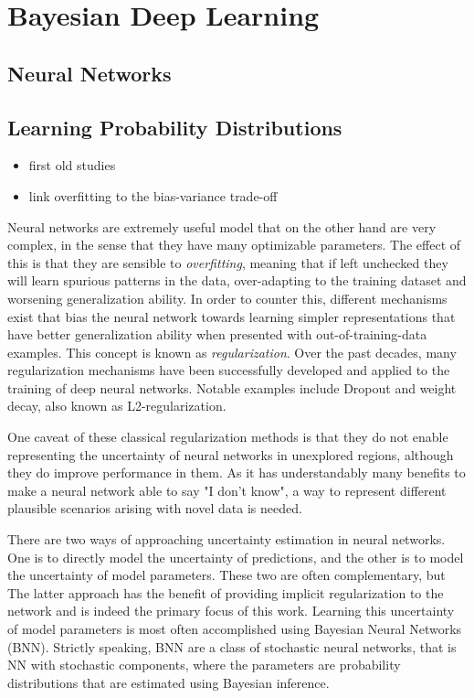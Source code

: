 \section{Bayesian Deep Learning}

\subsection{Neural Networks}

\subsection{Learning Probability Distributions}
\begin{itemize}
	\item first old studies
	\item link overfitting to the bias-variance trade-off
\end{itemize}

	Neural networks are extremely useful model that on the other hand are very complex, in the sense that they have many optimizable parameters. The effect of this is that they are sensible to \textit{overfitting}, meaning that if left unchecked they will learn spurious patterns in the data, over-adapting to the training dataset and worsening generalization ability. In order to counter this, different mechanisms exist that bias the neural network towards learning simpler representations that have better generalization ability when presented with out-of-training-data examples. This concept is known as \textit{regularization}. Over the past decades, many regularization mechanisms have been successfully developed and applied to the training of deep neural networks. Notable examples include Dropout and weight decay, also known as L2-regularization.  
	
	One caveat of these classical regularization methods is that they do not enable representing the uncertainty of neural networks in unexplored regions, although they do improve performance in them. As it has understandably many benefits to make a neural network able to say "I don't know", a way to represent different plausible scenarios arising with novel data is needed. 
	
	There are two ways of approaching uncertainty estimation in neural networks. One is to directly model the uncertainty of predictions, and the other is to model the uncertainty of model parameters. These two are often complementary, but The latter approach has the benefit of providing implicit regularization to the network and is indeed the primary focus of this work. Learning this uncertainty of model parameters is most often accomplished using Bayesian Neural Networks (BNN). Strictly speaking, BNN are a class of stochastic neural networks, that is NN with stochastic components, where the parameters are probability distributions that are estimated using Bayesian inference.
	
